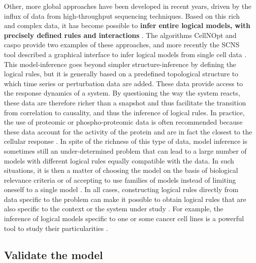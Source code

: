 \documentclass[a4paper,12pt,twoside,onecolumn,openright,final,oldfontcommands]{memoir}
\begin{document}
Other, more global approaches have been developed in recent years,
driven by the influx of data from high-throughput sequencing techniques.
Based on this rich and complex data, it has become possible to
\textbf{infer entire logical models, with precisely defined rules and
interactions} \citep{ostrowski2016boolean}. The algorithms CellNOpt
\citep{terfve2012cellnoptr} and caspo \citep{videla2017caspo} provide
two examples of these approaches, and more recently the SCNS tool
described a graphical interface to infer logical models from single cell
data \citep{woodhouse2018scns}. This model-inference goes beyond simpler
structure-inference by defining the logical rules, but it is generally
based on a predefined topological structure to which time series or
perturbation data are added. These data provide access to the response
dynamics of a system. By questioning the way the system reacts, these
data are therefore richer than a snapshot and thus facilitate the
transition from correlation to causality, and thus the inference of
logical rules. In practice, the use of proteomic or phospho-proteomic
data is often recommended because these data account for the activity of
the protein and are in fact the closest to the cellular response
\citep{ostrowski2016boolean, terfve2012cellnoptr, terfve2015largescale}.
In spite of the richness of this type of data, model inference is
sometimes still an under-determined problem that can lead to a large
number of models with different logical rules equally compatible with
the data. In such situations, it is then a matter of choosing the model
on the basis of biological relevance criteria or of accepting to use
families of models instead of limiting oneself to a single model
\citep{videla2017caspo}. In all cases, constructing logical rules
directly from data specific to the problem can make it possible to
obtain logical rules that are also specific to the context or the system
under study \citep{saezrodriguez2011comparing}. For example, the
inference of logical models specific to one or some cancer cell lines is
a powerful tool to study their particularities
\citep{razzaq2018computational}.

\subsection{Validate the model}\label{validate-the-model}
\end{document}
